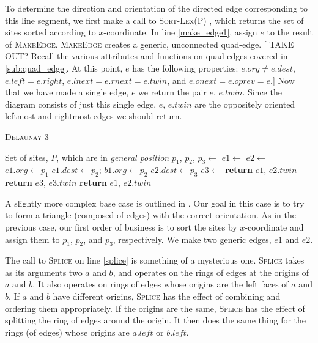 \documentclass[12pt,twoside]{reedthesis}
\begin{document}
    To determine the direction and orientation of the directed edge corresponding to this line segment, we first make a call to \textsc{Sort-Lex}(P) , which returns the set of sites sorted according to $x$-coordinate. In line \ref{make_edge1}, assign $e$ to the result of \textsc{MakeEdge}. \textsc{MakeEdge} creates a generic, unconnected quad-edge. [ TAKE OUT? Recall the various attributes and functions on quad-edges covered in \cref{sub:quad_edge}. At this point, $e$ has the following properties: $e.org \neq e.dest$, $e.left = e.right$, $e.lnext = e.rnext = e.twin$, and $e.onext = e.oprev = e$.] Now that we have made a single edge, $e$ we return the pair $e$, $e.twin$. Since the diagram consists of just this single edge, $e$, $e.twin$ are the oppositely oriented leftmost and rightmost edges we should return.


    \begin{algorithm}[!htb]
    \caption{\textsc{Delaunay-3}}\label{bc_del_3}
    \begin{algorithmic}[1]
    \Require Set of sites, $P$, which are in \emph{general position}
      \State $p_{1}$, $p_{2}$, $p_{3}\gets$ \label{sort_2}
      \State $e1\gets$
      \State $e2\gets$
      \State {} \label{splice}
      \State $e1.org\gets p_{1}$
      \State $e1.dest\gets p_{2}$; $b1.org\gets p_{2}$
      \State $e2.dest\gets p_{3}$
      \State $e3\gets$
       
        \State \textbf{return} $e1$, $e2.twin$
        \State \textbf{return} $e3$, $e3.twin$
      \Else {}
        \State \textbf{return} $e1$, $e2.twin$ \label{return_2}
      \EndIf
    \EndProcedure
    \end{algorithmic} 
    \end{algorithm}

    A slightly more complex base case is outlined in . Our goal in this case is to try to form a triangle (composed of edges) with the correct orientation.  As in the previous case, our first order of business is to sort the sites by $x$-coordinate and assign them to $p_{1}$, $p_{2}$, and $p_{3}$, respectively. We make two generic edges, $e1$ and $e2$. \par

    The call to \textsc{Splice} on line \ref{splice} is something of a mysterious one. \textsc{Splice} takes as its arguments two $a$ and $b$, and operates on the rings of edges at the origins of $a$ and $b$. It also operates on rings of edges whose origins are the left faces of $a$ and $b$. If $a$ and $b$ have different origins, \textsc{Splice} has the effect of combining and ordering them appropriately. If the origins are the same, \textsc{Splice} has the effect of splitting the ring of edges around the origin. It then does the same thing for the rings (of edges) whose origins are $a.left$ or $b.left$. \par
\end{document}
